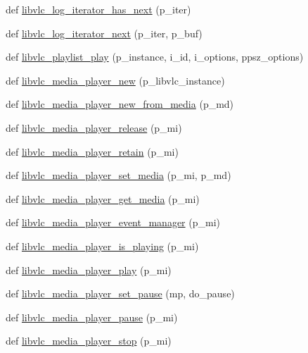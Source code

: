 \begin{DoxyCompactItemize}
\item 
def \hyperlink{namespacevlc_a7637cd4511fa87f32eeff4bbfa44907b}{libvlc\+\_\+log\+\_\+iterator\+\_\+has\+\_\+next} (p\+\_\+iter)
\item 
def \hyperlink{namespacevlc_ae704638f284c91d4cb97d6731606dbef}{libvlc\+\_\+log\+\_\+iterator\+\_\+next} (p\+\_\+iter, p\+\_\+buf)
\item 
def \hyperlink{namespacevlc_ac8504e0fea6e5eb569fd5b008db60263}{libvlc\+\_\+playlist\+\_\+play} (p\+\_\+instance, i\+\_\+id, i\+\_\+options, ppsz\+\_\+options)
\item 
def \hyperlink{namespacevlc_afb765953dae813dbf71b86a8aec719fe}{libvlc\+\_\+media\+\_\+player\+\_\+new} (p\+\_\+libvlc\+\_\+instance)
\item 
def \hyperlink{namespacevlc_a552e823b93376bc5531aaea72b1526c5}{libvlc\+\_\+media\+\_\+player\+\_\+new\+\_\+from\+\_\+media} (p\+\_\+md)
\item 
def \hyperlink{namespacevlc_a81e3d692fb602bd1b936420d32fd5cff}{libvlc\+\_\+media\+\_\+player\+\_\+release} (p\+\_\+mi)
\item 
def \hyperlink{namespacevlc_aa0ba6b8fa96181ca59a4b12aa2b2ccde}{libvlc\+\_\+media\+\_\+player\+\_\+retain} (p\+\_\+mi)
\item 
def \hyperlink{namespacevlc_ad66d2344f5584cd004b224120ade9077}{libvlc\+\_\+media\+\_\+player\+\_\+set\+\_\+media} (p\+\_\+mi, p\+\_\+md)
\item 
def \hyperlink{namespacevlc_afeedcdc930247eca6504d41de3af7275}{libvlc\+\_\+media\+\_\+player\+\_\+get\+\_\+media} (p\+\_\+mi)
\item 
def \hyperlink{namespacevlc_a342f922c85a8846fd115bc0dfb1db186}{libvlc\+\_\+media\+\_\+player\+\_\+event\+\_\+manager} (p\+\_\+mi)
\item 
def \hyperlink{namespacevlc_ab4fefef2802730d42090b8fdcaf8dc8a}{libvlc\+\_\+media\+\_\+player\+\_\+is\+\_\+playing} (p\+\_\+mi)
\item 
def \hyperlink{namespacevlc_a17af4b7be817987cbc47625092cb49f3}{libvlc\+\_\+media\+\_\+player\+\_\+play} (p\+\_\+mi)
\item 
def \hyperlink{namespacevlc_a4e7da817fafe9c1c27e7b6724bb744b8}{libvlc\+\_\+media\+\_\+player\+\_\+set\+\_\+pause} (mp, do\+\_\+pause)
\item 
def \hyperlink{namespacevlc_a14e54bf8f28013d3b04df6b07a717fba}{libvlc\+\_\+media\+\_\+player\+\_\+pause} (p\+\_\+mi)
\item 
def \hyperlink{namespacevlc_a66bcd32fe71f703084d52d175874f6e1}{libvlc\+\_\+media\+\_\+player\+\_\+stop} (p\+\_\+mi)

\end{DoxyCompactItemize}
